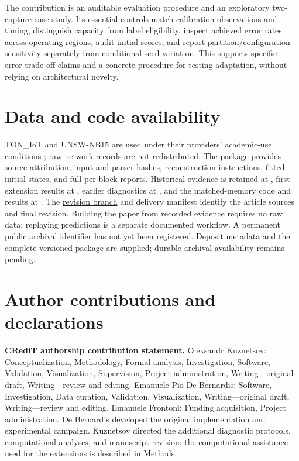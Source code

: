 The contribution is an auditable evaluation procedure and an exploratory two-capture case study. Its essential controls match calibration observations and timing, distinguish capacity from label eligibility, inspect achieved error rates across operating regions, audit initial scores, and report partition/configuration sensitivity separately from conditional seed variation. This supports specific error-trade-off claims and a concrete procedure for testing adaptation, without relying on architectural novelty.

\section*{Data and code availability}
TON\_IoT and UNSW-NB15 are used under their providers' academic-use conditions \citep{toniotweb,unswweb}; raw network records are not redistributed. The package provides source attribution, input and parser hashes, reconstruction instructions, fitted initial states, and full per-block reports. Historical evidence is retained at , first-extension results at \href{https://github.com/KuznetsovKarazin/kan-ids-v2/commit/54871f0f36b22a69fe9a114a617d957b896da7b1}{}, earlier diagnostics at \href{https://github.com/KuznetsovKarazin/kan-ids-v2/commit/dd9e0ea8bb2d8c9d8283e752e8a059b104291390}{}, and the matched-memory code and results at \href{https://github.com/KuznetsovKarazin/kan-ids-v2/commit/c2401824e3cbae6937573d2c5b91554aeb14ecb2}{}. The \href{https://github.com/KuznetsovKarazin/kan-ids-v2/tree/paper2/review-extension-20261101/adattamento-drift/review_extension}{revision branch} and delivery manifest identify the article sources and final revision. Building the paper from recorded evidence requires no raw data; replaying predictions is a separate documented workflow. A permanent public archival identifier has not yet been registered. Deposit metadata and the complete versioned package are supplied; durable archival availability remains pending.

\section*{Author contributions and declarations}
\noindent\textbf{CRediT authorship contribution statement.} Oleksandr Kuznetsov: Conceptualization, Methodology, Formal analysis, Investigation, Software, Validation, Visualization, Supervision, Project administration, Writing---original draft, Writing---review and editing. Emanuele Pio De Bernardis: Software, Investigation, Data curation, Validation, Visualization, Writing---original draft, Writing---review and editing. Emanuele Frontoni: Funding acquisition, Project administration. De Bernardis developed the original implementation and experimental campaign. Kuznetsov directed the additional diagnostic protocols, computational analyses, and manuscript revision; the computational assistance used for the extensions is described in Methods.

